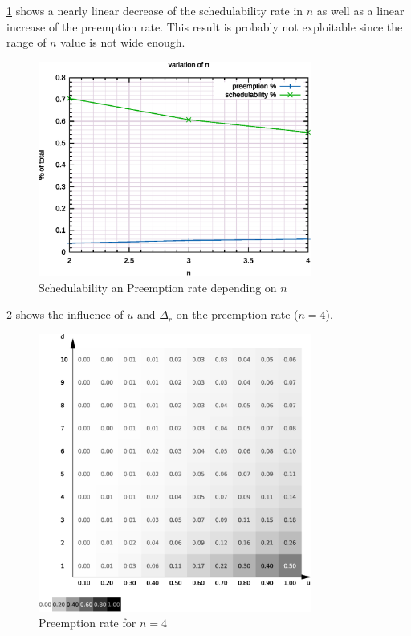 \ref{fig:stu:an} shows a nearly linear decrease of the schedulability rate in $n$ as well as a linear increase of the preemption rate. This result is probably not exploitable since the range of $n$ value is not wide enough.

\begin{figure}
	\centering
	\includegraphics[width=0.8\textwidth]{../gnuplot/eps/3}
	\caption{\label{fig:stu:an} Schedulability an Preemption rate depending on $n$}
\end{figure}

\ref{fig:stu:4p} shows the influence of $u$ and $\Delta_r$ on the preemption rate ($n = 4$).

\begin{figure}
	\centering
	\includegraphics[width=0.8\textwidth]{../mean/eps/4p}
	\caption{\label{fig:stu:4p} Preemption rate for $n = 4$}
\end{figure}

